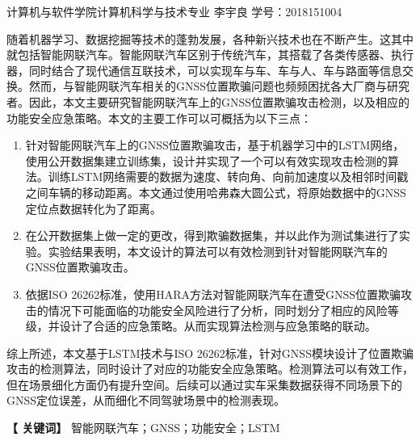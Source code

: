 \newpage


\centerline{\fangsong\bf{}}
\vspace{\baselineskip}
\centerline{\fangsong\bf{}}


\vskip 1cm

\begin{center}
	\kaishu
	\hspace{2cm}计算机与软件学院计算机科学与技术专业 \quad 李宇良
	\vspace{5bp}
	\newline
	学号：2018151004
\end{center}

\vskip 10bp

{
\kaishu
{}
随着机器学习、数据挖掘等技术的蓬勃发展，各种新兴技术也在不断产生。这其中就包括智能网联汽车。智能网联汽车区别于传统汽车，其搭载了各类传感器、执行器，同时结合了现代通信互联技术，可以实现车与车、车与人、车与路面等信息交换。然而，与智能网联汽车相关的GNSS位置欺骗问题也频频困扰各大厂商与研究者。因此，本文主要研究智能网联汽车上的GNSS位置欺骗攻击检测，以及相应的功能安全应急策略。本文的主要工作可以可概括为以下三点：
\begin{enumerate}
    \item 针对智能网联汽车上的GNSS位置欺骗攻击，基于机器学习中的LSTM网络，使用公开数据集建立训练集，设计并实现了一个可以有效实现攻击检测的算法。训练LSTM网络需要的数据为速度、转向角、向前加速度以及相邻时间戳之间车辆的移动距离。本文通过使用哈弗森大圆公式，将原始数据中的GNSS定位点数据转化为了距离。
    \item 在公开数据集上做一定的更改，得到欺骗数据集，并以此作为测试集进行了实验。实验结果表明，本文设计的算法可以有效检测到针对智能网联汽车的GNSS位置欺骗攻击。
    \item 依据ISO 26262标准，使用HARA方法对智能网联汽车在遭受GNSS位置欺骗攻击的情况下可能面临的功能安全风险进行了分析，同时划分了相应的风险等级，并设计了合适的应急策略。从而实现算法检测与应急策略的联动。
\end{enumerate}
综上所述，本文基于LSTM技术与ISO 26262标准，针对GNSS模块设计了位置欺骗攻击的检测算法，同时设计了对应的功能安全应急策略。检测算法可以有效工作，但在场景细化方面仍有提升空间。后续可以通过实车采集数据获得不同场景下的GNSS定位误差，从而细化不同驾驶场景中的检测表现。

\vskip 10bp

\hspace{5bp} {\textbf{【 关键词】}}
智能网联汽车；GNSS；功能安全；LSTM
}
